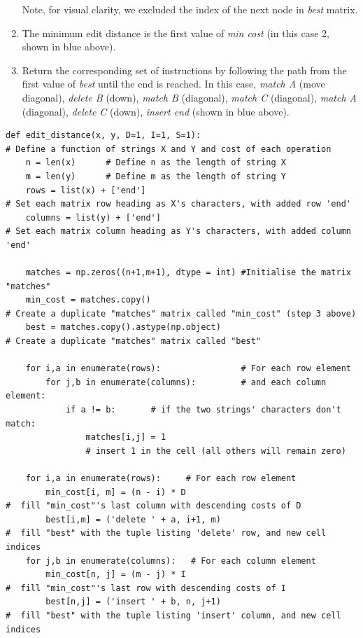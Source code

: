 \documentclass{article}
\begin{document}
\begin{enumerate}
	Note, for visual clarity, we excluded the index of the next node in \textit{best} matrix.
	\item The minimum edit distance is the first value of \textit{min cost} (in this case 2, shown in blue above).  
	\item Return the corresponding set of instructions by following the path from the first value of \textit{best} until the end is reached.  In this case, \textit{match A} (move diagonal), \textit{delete B} (down), \textit{match B} (diagonal), \textit{match C} (diagonal), \textit{match A} (diagonal), \textit{delete C} (down), \textit{insert end} (shown in blue above). 

\end{enumerate}


\begin{lstlisting}
def edit_distance(x, y, D=1, I=1, S=1): 
# Define a function of strings X and Y and cost of each operation
    n = len(x)      # Define n as the length of string X
    m = len(y)      # Define m as the length of string Y
    rows = list(x) + ['end']                              
# Set each matrix row heading as X's characters, with added row 'end' 
    columns = list(y) + ['end']                        
# Set each matrix column heading as Y's characters, with added column 'end'
    
    matches = np.zeros((n+1,m+1), dtype = int) #Initialise the matrix "matches"
    min_cost = matches.copy()                             
# Create a duplicate "matches" matrix called "min_cost" (step 3 above)
    best = matches.copy().astype(np.object)               
# Create a duplicate "matches" matrix called "best"
    
    for i,a in enumerate(rows):                # For each row element
        for j,b in enumerate(columns):         # and each column element:
            if a != b:       # if the two strings' characters don't match:
                matches[i,j] = 1  
                # insert 1 in the cell (all others will remain zero)
    
    for i,a in enumerate(rows):     # For each row element
        min_cost[i, m] = (n - i) * D                      
#  fill "min_cost"'s last column with descending costs of D
        best[i,m] = ('delete ' + a, i+1, m)               
#  fill "best" with the tuple listing 'delete' row, and new cell indices 
    for j,b in enumerate(columns):   # For each column element 
        min_cost[n, j] = (m - j) * I                      
#  fill "min_cost"'s last row with descending costs of I
        best[n,j] = ('insert ' + b, n, j+1)               
#  fill "best" with the tuple listing 'insert' column, and new cell indices 
    

\end{lstlisting}
\end{document}
